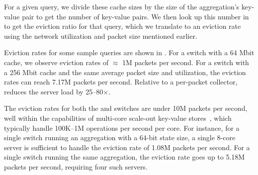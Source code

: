 For a given query, we divide these cache sizes by the size of
the aggregation's key-value pair to get
the number of key-value pairs. We then look up this number in 
to get the eviction ratio for that query, which we translate to an eviction rate
using the network utilization and packet size mentioned earlier.

Eviction rates for some sample queries are shown in .
 For a \tengswitch switch with a 64 Mbit cache, we observe eviction rates of
$\approx$ 1M packets per second.  For a \hundredgswitch switch with a 256 Mbit
cache and the same average packet size and utilization, the eviction rates can
reach
 7.17M packets per second. Relative to a per-packet collector,
\TheSystem reduces the server load by 25--80$\times$.

The eviction rates for both the \tenglink and \hundredglink switches are
under 10M packets per second, well within the capabilities of multi-core
scale-out key-value
stores~\cite{redis_benchmark, memcached_benchmark, redis_vs_memcached_update},
which typically handle 100K--1M operations per second per core.  For instance,
for a single \tengswitch switch running an aggregation with a 64-bit
state size, a single 8-core server is sufficient to handle the eviction rate of
1.08M packets per second. For a single \hundredgswitch switch running
the same aggregation, the eviction rate goes up to 5.18M packets per
second, requiring four such servers.

